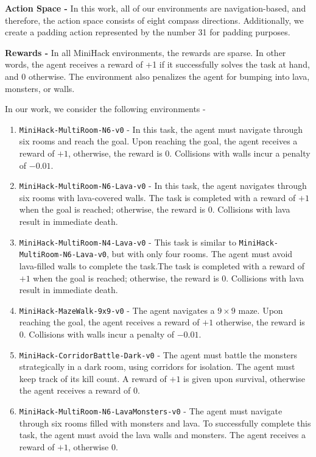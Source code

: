\textbf{Action Space - } In this work, all of our environments are navigation-based, and therefore, the action space consists of eight compass directions. Additionally, we create a padding action represented by the number 31 for padding purposes.

\textbf{Rewards - } In all MiniHack environments, the rewards are sparse. In other words, the agent receives a reward of +1 if it successfully solves the task at hand, and 0 otherwise. The environment also penalizes the agent for bumping into lava, monsters, or walls. 

In our work, we consider the following environments - 
\begin{enumerate}
    \item \texttt{MiniHack-MultiRoom-N6-v0} -  In this task, the agent must navigate through six rooms and reach the goal. Upon reaching the goal, the agent receives a reward of $+1$, otherwise, the reward is $0$. Collisions with walls incur a penalty of $-0.01$.
    \item \texttt{MiniHack-MultiRoom-N6-Lava-v0} - In this task, the agent navigates through six rooms with lava-covered walls. The task is completed with a reward of $+1$ when the goal is reached; otherwise, the reward is $0$. Collisions with lava result in immediate death.
    \item \texttt{MiniHack-MultiRoom-N4-Lava-v0} - This task is similar to \texttt{MiniHack-MultiRoom-N6-Lava-v0}, but with only four rooms. The agent must avoid lava-filled walls to complete the task.The task is completed with a reward of $+1$ when the goal is reached; otherwise, the reward is $0$. Collisions with lava result in immediate death.
    \item \texttt{MiniHack-MazeWalk-9x9-v0} - The agent navigates a $9 \times 9$ maze. Upon reaching the goal, the agent receives a reward of $+1$ otherwise, the reward is $0$. Collisions with walls incur a penalty of $-0.01$. 
    \item \texttt{MiniHack-CorridorBattle-Dark-v0} -  The agent must battle the monsters strategically in a dark room, using corridors for isolation. The agent must keep track of its kill count. A reward of $+1$ is given upon survival, otherwise the agent receives a reward of $0$. 
    \item \texttt{MiniHack-MultiRoom-N6-LavaMonsters-v0} - The agent must navigate through six rooms filled with monsters and lava. To successfully complete this task, the agent must avoid the lava walls and monsters.  The agent receives a reward of $+1$, otherwise $0$. 

\end{enumerate}
